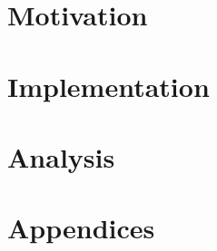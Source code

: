 \documentclass[ oneside,openright,titlepage,numbers=noenddot,headinclude,%
                a4paper,
                footinclude=true,cleardoublepage=empty,abstractoff, %
                BCOR=5mm,paper=a4,fontsize=11pt,%
                british,%
                ]{scrreprt}
\begin{document}
\frenchspacing
\raggedbottom
{} %
\renewcommand*{\bibname}{References}
\pagestyle{plain}







%

\onehalfspacing

\singlespacing
%


\pagestyle{scrheadings}
\doublespacing

\singlespacing

\doublespacing
\part{Motivation}

\part{Implementation}



\part{Analysis}



\singlespacing

\appendix
\cleardoublepage
\part{Appendices}


\printglossaries
\newpage
\doublespacing

\singlespacing


\end{document}
